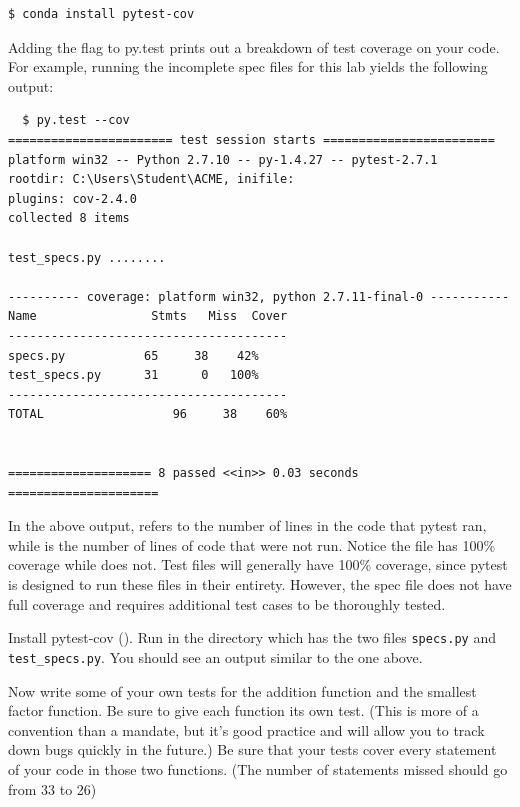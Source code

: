 \begin{lstlisting}
$ conda install pytest-cov
\end{lstlisting}

Adding the flag  to py.test prints out a breakdown of test coverage on your code. For example, running the incomplete spec files for this lab yields the following output:

\begin{lstlisting}
  $ py.test --cov
======================= test session starts ========================
platform win32 -- Python 2.7.10 -- py-1.4.27 -- pytest-2.7.1
rootdir: C:\Users\Student\ACME, inifile:
plugins: cov-2.4.0
collected 8 items

test_specs.py ........

---------- coverage: platform win32, python 2.7.11-final-0 -----------
Name                Stmts   Miss  Cover
---------------------------------------
specs.py           65     38    42%
test_specs.py      31      0   100%
---------------------------------------
TOTAL                  96     38    60%


==================== 8 passed <<in>> 0.03 seconds =====================
\end{lstlisting}

In the above output,  refers to the number of lines in the code that pytest ran, while  is the number of lines of code that were not run.
Notice the file  has 100\% coverage while  does not. Test files will generally have 100\% coverage, since pytest is designed to run these files in their entirety. However, the spec file does not have full coverage and requires additional test cases to be thoroughly tested.

\begin{problem}
Install pytest-cov ().
Run  in the directory which has the two files \texttt{specs.py} and \texttt{test\_specs.py}. You should see an output similar to the one above.

Now write some of your own tests for the addition function and the smallest factor function. Be sure to give each function its own test. (This is more of a convention than a mandate,
but it's good practice and will allow you to track down bugs quickly in the future.) Be sure that your tests cover every statement of your code in those two functions.
(The number of statements missed should go from 33 to 26)
\end{problem}


